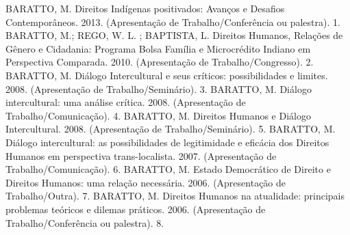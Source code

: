 
\begin{cvhonors}
  \cvhonor
    {BARATTO, M.}
    {Direitos Indígenas positivados: Avanços e Desafios Contemporâneos. 2013. (Apresentação de Trabalho/Conferência ou palestra).}
    {}
    {1. }
  \cvhonor
    {BARATTO, M.; REGO, W. L. ; BAPTISTA, L.}
    {Direitos Humanos, Relações de Gênero e Cidadania: Programa Bolsa Família e Microcrédito Indiano em Perspectiva Comparada. 2010. (Apresentação de Trabalho/Congresso).}
    {}
    {2. }
  \cvhonor
    {BARATTO, M.}
    {Diálogo Intercultural e seus críticos: possibilidades e limites. 2008. (Apresentação de Trabalho/Seminário).}
    {}
    {3. }
  \cvhonor
    {BARATTO, M.}
    {Diálogo intercultural: uma análise crítica. 2008. (Apresentação de Trabalho/Comunicação).}
    {}
    {4. }
  \cvhonor
    {BARATTO, M.}
    {Direitos Humanos e Diálogo Intercultural. 2008. (Apresentação de Trabalho/Seminário).}
    {}
    {5. }
  \cvhonor
    {BARATTO, M.}
    {Diálogo intercultural: as possibilidades de legitimidade e eficácia dos Direitos Humanos em perspectiva trans-localista. 2007. (Apresentação de Trabalho/Comunicação).}
    {}
    {6. }
  \cvhonor
    {BARATTO, M.}
    {Estado Democrático de Direito e Direitos Humanos: uma relação necessária. 2006. (Apresentação de Trabalho/Outra).}
    {}
    {7. }
  \cvhonor
    {BARATTO, M.}
    {Direitos Humanos na atualidade: principais problemas teóricos e dilemas práticos. 2006. (Apresentação de Trabalho/Conferência ou palestra).}
    {}
    {8. }
\end{cvhonors}


